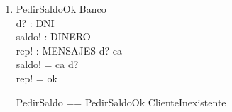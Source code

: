 \documentclass[11pt]{article}
\begin{document}
\begin{enumerate}
    \begin{schema}{SaldoInsuficiente}
      \Xi Banco \\
      d? : DNI \\
      m?: DINERO \\
      rep! : MENSAJES
      \where
      m? > 0.5 * ca \; d? \\
      d? \in \dom ca \\
      rep! = noPoseeSaldoSuficiente
    \end{schema}

    \item
    \begin{schema}{PedirSaldoOk}
      \Xi Banco \\
      d? : DNI \\
      saldo! : DINERO \\
      rep! : MENSAJES
      \where
      d? \in \dom ca \\
      saldo! = ca \; d? \\
      rep! = ok
    \end{schema}

    \begin{zed}
      PedirSaldo == PedirSaldoOk \lor ClienteInexistente
    \end{zed}
  \end{enumerate}
\end{document}
